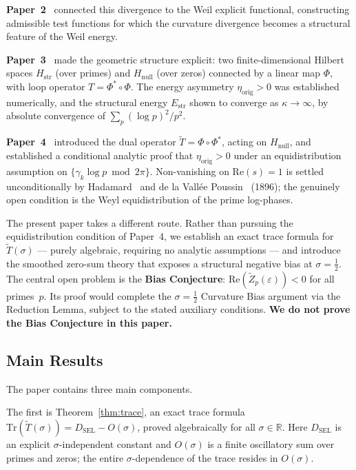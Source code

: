 \documentclass[11pt]{article}
\newcommand{\Hstr}{H_{\mathrm{str}}}
\newcommand{\Hnull}{H_{\mathrm{null}}}
\newcommand{\Estr}{E_{\mathrm{str}}}
\newcommand{\etaorig}{\eta_{\mathrm{orig}}}
\newcommand{\Tt}{\widetilde{T}}
\newcommand{\Zt}{\widetilde{Z}}
\newcommand{\DSEL}{D_{\mathrm{SEL}}}
\begin{document}
\textbf{Paper~2}~\cite{Paper2} connected this divergence to the Weil
explicit functional, constructing admissible test functions
for which the curvature divergence becomes a structural feature of
the Weil energy.

\textbf{Paper~3}~\cite{Paper3} made the geometric structure explicit:
two finite-dimensional Hilbert spaces $\Hstr$ (over primes) and
$\Hnull$ (over zeros) connected by a linear map $\Phi$, with loop
operator $T=\Phi^*\circ\Phi$.
The energy asymmetry $\etaorig>0$ was established numerically, and
the structural energy $\Estr$ shown to converge as $\kappa\to\infty$,
by absolute convergence of $\sum_p(\log p)^2/p^2$.

\textbf{Paper~4}~\cite{Paper4} introduced the dual operator
$\Tt=\Phi\circ\Phi^*$, acting on $\Hnull$, and established a
conditional analytic proof that $\etaorig>0$ under an equidistribution
assumption on $\{\gamma_k\log p\bmod 2\pi\}$.
Non-vanishing on $\mathrm{Re}(s)=1$ is settled unconditionally by
Hadamard~\cite{Hadamard} and de la Vall\'ee Poussin~\cite{dlVP}
(1896); the genuinely open
condition is the Weyl equidistribution of the prime log-phases.

The present paper takes a different route.
Rather than pursuing the equidistribution condition of Paper~4,
we establish an exact trace formula for $\Tt(\sigma)$ --- purely
algebraic, requiring no analytic assumptions --- and introduce
the smoothed zero-sum theory that exposes a structural negative
bias at $\sigma=\tfrac{1}{2}$.
The central open problem is the \textbf{Bias Conjecture}:
$\mathrm{Re}(\Zt_p(\varepsilon))<0$ for all primes~$p$.
Its proof would complete the $\sigma=\tfrac{1}{2}$ Curvature Bias
argument via the Reduction Lemma, subject to the stated auxiliary
conditions.
\textbf{We do not prove the Bias Conjecture in this paper.}

\subsection{Main Results}

The paper contains three main components.

The first is Theorem~\ref{thm:trace}, an exact trace formula
$\mathrm{Tr}(\Tt(\sigma)) = \DSEL - O(\sigma)$,
proved algebraically for all $\sigma\in\mathbb{R}$.
Here $\DSEL$ is an explicit $\sigma$-independent constant and
$O(\sigma)$ is a finite oscillatory sum over primes and zeros;
the entire $\sigma$-dependence of the trace resides in $O(\sigma)$.
\end{document}
